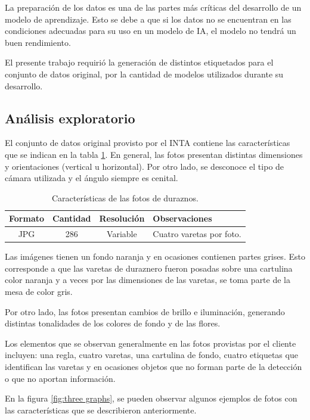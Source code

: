 La preparación de los datos es una de las partes más críticas del desarrollo de un modelo de aprendizaje. Esto se debe a que si los datos no se encuentran en las condiciones adecuadas para su uso en un modelo de IA, el modelo no tendrá un buen rendimiento. 

El presente trabajo requirió la generación de distintos etiquetados para el conjunto de datos original, por la cantidad de modelos utilizados durante su desarrollo.

\subsection{Análisis exploratorio}
\label{section3.2.1}
El conjunto de datos original provisto por el INTA contiene las características que se indican en la tabla \ref{tab:flores}. En general, las fotos presentan distintas dimensiones y orientaciones (vertical u horizontal). Por otro lado, se desconoce el tipo de cámara utilizada y el ángulo siempre es cenital.


\begin{table}[h]
	\centering
	\caption{Características de las fotos de duraznos.}
	\begin{tabular}{c c c l}    
		\toprule
		\textbf{Formato}     & \textbf{Cantidad} & \textbf{Resolución} & \textbf{Observaciones}\\
		\midrule
		JPG                  & 286               &  Variable &  Cuatro varetas por foto.\\		
		\bottomrule
		\hline
	\end{tabular}
	\label{tab:flores}
\end{table}
 
Las imágenes tienen un fondo naranja y en ocasiones contienen partes grises. Esto corresponde a que las varetas de duraznero fueron posadas sobre una cartulina color naranja y a veces por las dimensiones de las varetas, se toma parte de la mesa de color gris.

Por otro lado, las fotos presentan cambios de brillo e iluminación, generando distintas tonalidades de los colores de fondo y de las flores. 

Los elementos que se observan generalmente en las fotos provistas por el cliente incluyen: una regla, cuatro varetas, una cartulina de fondo, cuatro etiquetas que identifican las varetas y en ocasiones objetos que no forman parte de la detección o que no aportan información.

En la figura \ref{fig:three graphs}, se pueden observar algunos ejemplos de fotos con las características que se describieron anteriormente.

